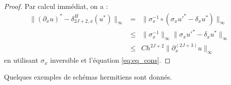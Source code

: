 \begin{proof}
Par calcul immédiat, on a :
\begin{equation}
\begin{array}{rcl}
\|  (\partial_x u)^* - \delta_{2J+2,x}^H (u^*) \|_{\infty} &=& \| \sigma_{x}^{-1} \circ \left( \sigma_{x} u'^*  - \delta_{x}u^*\right) \|_{\infty}\\
                                      &\leq& \| \sigma_{x}^{-1} \|_{\infty} \| \sigma_{x} u'^*  - \delta_{x}u^*\|_{\infty}\\
                                      &\leq& C h^{2J+2}  \| \partial_x^{(2J+3)} u \|_{\infty}
\end{array}
\end{equation}
en utilisant $\sigma_{x}$ inversible et l'équation \eqref{eq:eq_cons}.
\end{proof}
Quelques exemples de schémas hermitiens sont donnés.


